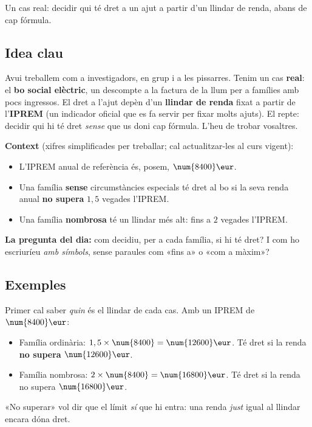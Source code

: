 %
{Un cas real: decidir qui té dret a un ajut a partir d'un llindar de renda, abans de cap fórmula.}

\subsection{Idea clau}

Avui treballem com a investigadors, en grup i a les pissarres. Tenim un cas
\textbf{real}: el \textbf{bo social elèctric}, un descompte a la factura de la llum
per a famílies amb pocs ingressos. El dret a l'ajut depèn d'un \textbf{llindar de
renda} fixat a partir de l'\textbf{IPREM} (un indicador oficial que es fa servir per
fixar molts ajuts). El repte: decidir qui hi té dret \emph{sense} que us doni cap
fórmula. L'heu de trobar vosaltres.

\begin{idea}
\textbf{Context} (xifres simplificades per treballar; cal actualitzar-les al curs vigent):
\begin{itemize}[leftmargin=1.4em, itemsep=2pt]
  \item L'IPREM anual de referència és, posem, $\num{8400}\eur$.
  \item Una família \textbf{sense} circumstàncies especials té dret al bo si la seva
        renda anual \textbf{no supera} $1,5$ vegades l'IPREM.
  \item Una família \textbf{nombrosa} té un llindar més alt: fins a $2$ vegades l'IPREM.
\end{itemize}
\textbf{La pregunta del dia:} com decidiu, per a cada família, si hi té dret? I com
ho escriuríeu \emph{amb símbols}, sense paraules com «fins a» o «com a màxim»?
\end{idea}

\subsection{Exemples}

\begin{exemple}
Primer cal saber \emph{quin} és el llindar de cada cas. Amb un IPREM de $\num{8400}\eur$:
\begin{itemize}[leftmargin=1.4em, itemsep=2pt]
  \item Família ordinària: $1,5\times\num{8400}=\num{12600}\eur$. Té dret si la renda
        \textbf{no supera} $\num{12600}\eur$.
  \item Família nombrosa: $2\times\num{8400}=\num{16800}\eur$. Té dret si la renda no
        supera $\num{16800}\eur$.
\end{itemize}
«No superar» vol dir que el límit \emph{sí} que hi entra: una renda \emph{just} igual
al llindar encara dóna dret.
\end{exemple}

